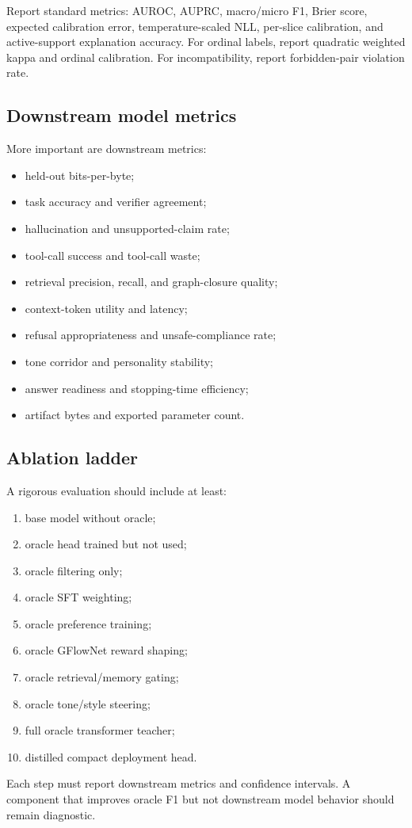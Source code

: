 \documentclass[11pt]{article}
\theoremstyle{definition}
\theoremstyle{remark}
\numberwithin{equation}{section}
\begin{document}
Report standard metrics: AUROC, AUPRC, macro/micro F1, Brier score, expected calibration error, temperature-scaled NLL, per-slice calibration, and active-support explanation accuracy.  For ordinal labels, report quadratic weighted kappa and ordinal calibration.  For incompatibility, report forbidden-pair violation rate.

\subsection{Downstream model metrics}

More important are downstream metrics:
\begin{itemize}
    \item held-out bits-per-byte;
    \item task accuracy and verifier agreement;
    \item hallucination and unsupported-claim rate;
    \item tool-call success and tool-call waste;
    \item retrieval precision, recall, and graph-closure quality;
    \item context-token utility and latency;
    \item refusal appropriateness and unsafe-compliance rate;
    \item tone corridor and personality stability;
    \item answer readiness and stopping-time efficiency;
    \item artifact bytes and exported parameter count.
\end{itemize}

\subsection{Ablation ladder}

A rigorous evaluation should include at least:
\begin{enumerate}
    \item base model without oracle;
    \item oracle head trained but not used;
    \item oracle filtering only;
    \item oracle SFT weighting;
    \item oracle preference training;
    \item oracle GFlowNet reward shaping;
    \item oracle retrieval/memory gating;
    \item oracle tone/style steering;
    \item full oracle transformer teacher;
    \item distilled compact deployment head.
\end{enumerate}
Each step must report downstream metrics and confidence intervals.  A component that improves oracle F1 but not downstream model behavior should remain diagnostic.
\end{document}
